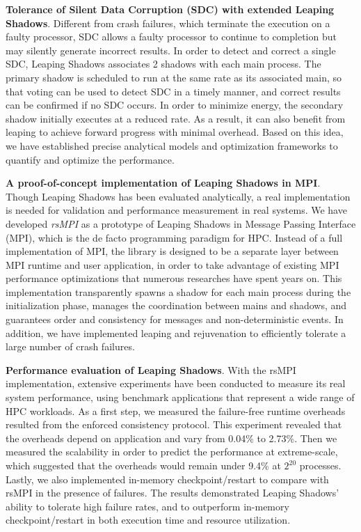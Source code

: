 \textbf{Tolerance of Silent Data Corruption (SDC) with extended Leaping Shadows}.
Different from crash failures, which terminate the execution on a faulty processor, SDC allows a faulty processor to continue to completion but may silently generate incorrect results. In order to detect and correct a single SDC, Leaping Shadows associates 2 shadows with each main process. The primary shadow is scheduled to run at the same rate as its associated main, so that voting can be used to detect SDC in a timely manner, and correct results can be confirmed if no SDC occurs. In order to minimize energy, the secondary shadow initially executes at a reduced rate. As a result, it can also benefit from leaping to achieve forward progress with minimal overhead. Based on this idea, we have established precise analytical models and optimization frameworks to
quantify and optimize the performance. 

\textbf{A proof-of-concept implementation of Leaping Shadows in MPI}.
Though Leaping Shadows has been evaluated analytically, a real implementation 
is needed for validation and performance measurement in real systems. We have developed \textit{rsMPI} as a prototype of Leaping Shadows in Message Passing Interface (MPI), which is the de facto programming paradigm for HPC. 
Instead of a full implementation of MPI, the library is designed to be a separate layer between MPI runtime and user application, in order to take advantage of existing MPI performance optimizations that numerous researches have spent years on. 
This implementation transparently spawns 
a shadow for each main process during the initialization phase, manages the coordination between mains and shadows, 
and guarantees order and consistency for messages and non-deterministic events. 
In addition, we have implemented leaping and rejuvenation to efficiently tolerate a large number of crash failures. 


\textbf{Performance evaluation of Leaping Shadows}.
With the rsMPI implementation, extensive experiments have been conducted to measure its real system performance, using benchmark applications that represent a wide range of HPC workloads. As a first step, we measured the failure-free runtime overheads resulted from the enforced consistency protocol. This experiment revealed that the overheads depend on application and vary from 0.04\% to 2.73\%. Then we measured the scalability in order to predict the performance at extreme-scale, which suggested that the overheads would remain under 9.4\% at $2^{20}$ processes. Lastly, we also implemented in-memory checkpoint/restart to compare with rsMPI in the presence of failures. The results demonstrated Leaping Shadows'
ability to tolerate high failure rates, and to outperform in-memory checkpoint/restart in both execution time and
resource utilization.


